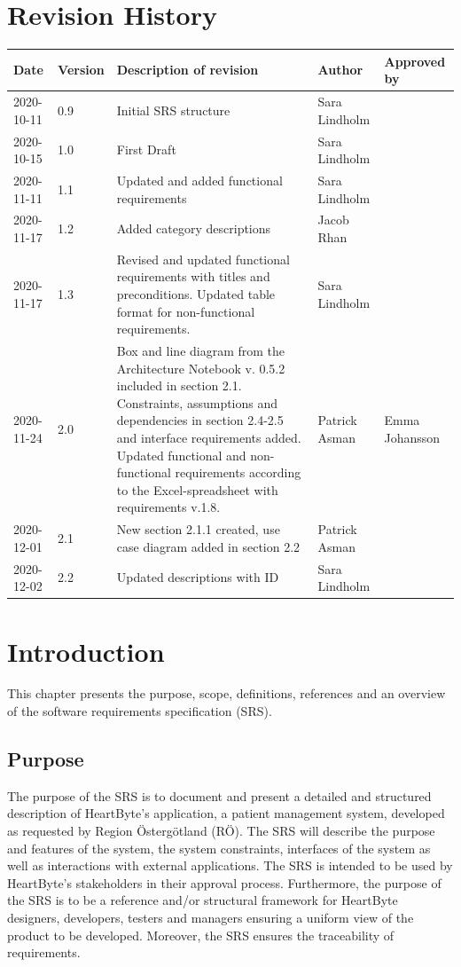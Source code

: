 \documentclass{scrreprt}
\begin{document}
\chapter*{Revision History}
\begin{center}
\begin{tabular}{|p{}|p{}|p{4.6cm}|p{2.5cm}|p{2.5cm}|}
 \hline
 \textbf{Date} & \textbf{Version} & \textbf{Description of revision} & \textbf{Author} & \textbf{Approved by} \\ 
 \hline
 2020-10-11 & 0.9 & Initial SRS structure & Sara Lindholm & \\
 \hline
 2020-10-15 & 1.0 & First Draft & Sara Lindholm & \\ 
 \hline
 2020-11-11 & 1.1 & Updated and added functional requirements & Sara Lindholm & \\
 \hline
 2020-11-17 & 1.2 & Added category descriptions & Jacob Rhan & \\
 \hline
 2020-11-17 & 1.3 & Revised and updated functional requirements with titles and preconditions. Updated table format for non-functional requirements. & Sara Lindholm & \\
 \hline 
 2020-11-24 & 2.0 & Box and line diagram from the Architecture Notebook v. 0.5.2 included in section 2.1. Constraints, assumptions and dependencies in section 2.4-2.5 and interface requirements added. Updated functional and non-functional requirements according to the Excel-spreadsheet with requirements v.1.8. & Patrick Asman & Emma Johansson \\
 \hline
 2020-12-01 & 2.1 & New section 2.1.1 created, use case diagram added in section 2.2 & Patrick Asman & \\
 \hline 
 2020-12-02 & 2.2 & Updated descriptions with ID & Sara Lindholm & \\
 \hline 
\end{tabular}
\end{center}

\tableofcontents

\chapter{Introduction}
This chapter presents the purpose, scope, definitions, references and an overview of the software requirements specification (SRS). 

\section{Purpose}
The purpose of the SRS is to document and present a detailed and structured description of HeartByte's application, a patient management system, developed as requested by Region Östergötland (RÖ). The SRS will describe the purpose and features of the system, the system constraints, interfaces of the system as well as interactions with external applications. The SRS is intended to be used by HeartByte’s stakeholders in their approval process. Furthermore, the purpose of the SRS is to be a reference and/or structural framework for HeartByte designers, developers, testers and managers ensuring a uniform view of the product to be developed. Moreover, the SRS ensures the traceability of requirements.
\end{document}
